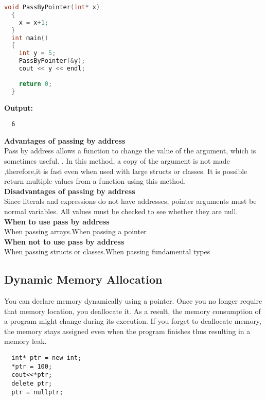 \documentclass[11pt,fleqn]{book} %
\begin{document}
\begin{lstlisting}[language=C++, caption = Pass by Address]
  void PassByPointer(int* x)
  {
    x = x+1; 
  }
  int main()
  {
    int y = 5;
    PassByPointer(&y); 
    cout << y << endl;
    
    return 0;
  }
\end{lstlisting} 
\textbf{Output:} 
\begin{lstlisting}
  6
\end{lstlisting}
\textbf{Advantages of passing by address}\\
Pass by address allows a function to change the value of the argument, which is sometimes useful. .
In this method, a copy of the argument is not made ,therefore,it is fast even when used with large structs or classes.
It is possible return multiple values from a function using this method.\\
\textbf{Disadvantages of passing by address}\\
Since literals and expressions do not have addresses, pointer arguments must be normal variables.
All values must be checked to see whether they are null.\\
\textbf{When to use pass by address}\\
When passing arrays.When passing a pointer\\
\textbf{When not to use pass by address}\\
When passing structs or classes.When passing fundamental types

\subsection{Dynamic Memory Allocation}
You can declare memory dynamically using a pointer. Once you no longer require that memory location, you deallocate it. As a result, the memory consumption of a program might change during its execution. If you forget to deallocate memory, the memory stays assigned even when the program finishes thus resulting in a memory leak.
\begin{lstlisting}
  int* ptr = new int;
  *ptr = 100;
  cout<<*ptr;
  delete ptr;
  ptr = nullptr;
\end{lstlisting}
\end{document}
